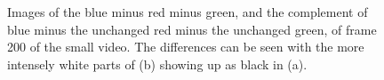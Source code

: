 \begin{figure}[h]

     \caption{Images of the blue minus red minus green, and the complement of blue minus the unchanged red minus the unchanged green, of frame 200 of the small video. The differences can be seen with the more intensely white parts of (b) showing up as black in (a).}
     
\end{figure}

